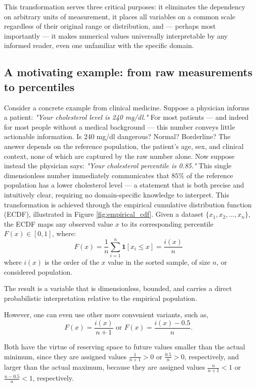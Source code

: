 This transformation serves three critical purposes: it eliminates the dependency on arbitrary units of measurement, it places all variables on a common scale regardless of their original range or distribution, and — perhaps most importantly — it makes numerical values universally interpretable by any informed reader, even one unfamiliar with the specific domain.

\subsection*{A motivating example: from raw measurements to percentiles}
Consider a concrete example from clinical medicine. Suppose a physician informs a patient: \textit{"Your cholesterol level is 240 mg/dl."} For most patients — and indeed for most people without a medical background — this number conveys little actionable information. Is 240 mg/dl dangerous? Normal? Borderline? The answer depends on the reference population, the patient's age, sex, and clinical context, none of which are captured by the raw number alone.
Now suppose instead the physician says: \textit{"Your cholesterol percentile is 0.85."} This single dimensionless number immediately communicates that $85\%$ of the reference population has a lower cholesterol level — a statement that is both precise and intuitively clear, requiring no domain-specific knowledge to interpret.
This transformation is achieved through the empirical cumulative distribution function (ECDF), illustrated in Figure \ref{fig:empirical_cdf}. Given a dataset $\{x_1, x_2, \ldots, x_n\}$, the ECDF maps any observed value $x$ to its corresponding percentile $F(x)\in [0,1]$, where:
\[
F(x) = \frac{1}{n} \sum_{i=1}^{n} \mathbf{1}[x_i \leq x] = \frac{i(x)}{n}
\]
where $i(x)$ is the order of the $x$ value in the sorted sample, of size $n$, or considered population.

The result is a variable that is dimensionless, bounded, and carries a direct probabilistic interpretation relative to the empirical population.

However, one can even use other more convenient variants, such as,
\[
F(x) = \frac{i(x)}{n+1} \mbox{ or }F(x) = \frac{i(x)-0.5}{n}.
\]

Both have the virtue of reserving space to future values smaller than the actual minimum, since they are assigned values $\frac{1}{n+1}>0$ or $\frac{0.5}{n}>0$, respectively, and larger than the actual maximum, because they are assigned values $\frac{n}{n+1}<1$ or $\frac{n-0.5}{n}<1$, respectively.


